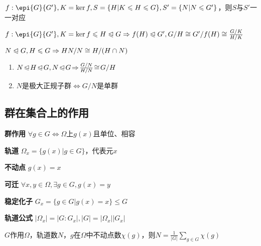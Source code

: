 \documentclass[a4paper,10pt]{ctexart}
\newcommand*{\impl}{\Rightarrow}
\renewcommand*{\iff}{\Leftrightarrow}
\renewcommand*{\leq}{\leqslant}
\newcommand*{\nmsubgroupeq}{\trianglelefteqslant}
\begin{document}
\begin{multicols}{3}
    \begin{theorem}[子群对应定理]
        $f: \epi{G}{G'}, K = \ker f, S = \{ H | K \leq H \leq G \}, S' = \{ N | N \leq G' \}$，则$S$与$S'$一一对应
    \end{theorem}

    \begin{theorem}
        \hfil

        $f: \epi{G}{G'}, K = \ker f \leq H \nmsubgroupeq G \impl f(H) \nmsubgroupeq G', G/H \cong G'/f(H) \cong \frac{G/K}{H/K}$
    \end{theorem}

    \begin{theorem}
        \hfil

        $N \nmsubgroupeq G, H \leq G \impl HN/N \cong H/(H \cap N)$
    \end{theorem}

    \begin{theorem}[推论]
        \hfil
        \begin{enumerate}
            \item $N \!\nmsubgroupeq\! H \!\nmsubgroupeq\! G, N \!\nmsubgroupeq\! G \!\impl\! \frac{G/N}{H/N} \!\cong\! G/H$
            \item $N$是极大正规子群$\iff G/N$是单群
        \end{enumerate}
    \end{theorem}

    \subsection{群在集合上的作用}

    \textbf{群作用} $\forall g \in G \iff \Omega$上$g(x)$且单位、相容

    \textbf{轨道} $\Omega_x = \{ g(x) | g \in G \}$，代表元$x$

    \textbf{不动点} $g(x) = x$

    \textbf{可迁} $\forall x, y \in \Omega, \exists g \in G, g(x) = y$

    \textbf{稳定化子} $G_x \! = \! \{ g \!\in\! G | g(x) \! = \! x \} \!\leq\! G$

    \textbf{轨道公式} $|\Omega_x| = |G : G_x|, |G| = |\Omega_x||G_x|$

    \begin{theorem}[Burnside 引理]
        $G$作用$\Omega$，轨道数$N$，$g$在$\Omega$中不动点数$\chi(g)$，则$N = \frac{1}{|G|} \sum\limits_{g \in G} \chi(g)$
    \end{theorem}


\end{multicols}
\end{document}

